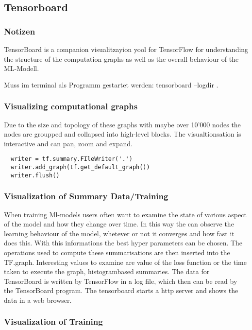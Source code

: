 \subsection{Tensorboard}
\subsubsection{Notizen}
TensorBoard is a companion visualitzayion yool for TensorFlow for understanding
the structure of the computation graphs as well as the overall behaviour of the
ML-Modell.

Muss im terminal als Programm gestartet werden: tensorboard --logdir .

\subsubsection{Visualizing computational graphs}
Due to the size and topology of these graphs with maybe over 10'000 nodes the
nodes are groupped and collapsed into high-level blocks. The visualtionsation is
interactive and can pan, zoom and expand.


\begin{verbatim}
  writer = tf.summary.FIleWriter('.')
  writer.add_graph(tf.get_default_graph())
  writer.flush()
\end{verbatim}

\subsubsection{Visualization of Summary Data/Training}
When training Ml-models users often want to examine the state of various aspect
of the model and how they change over time. In this way the can observe the
learning behaviour of the model, whetever or not it converges and how fast it
does this. With this informations the best hyper parameters can be chosen. The
operations used to compute these summarisations are then inserted into the
TF.graph. Interesting values to examine are value of the loss function or the
time taken to execute the graph, histogrambased summaries. The data for
TensorBoard is written by TensorFlow in a log file, which then can be read by
the TensorBoard program. The tensorboard starts a http server and shows the data
in a web browser.


\subsubsection{Visualization of Training}

